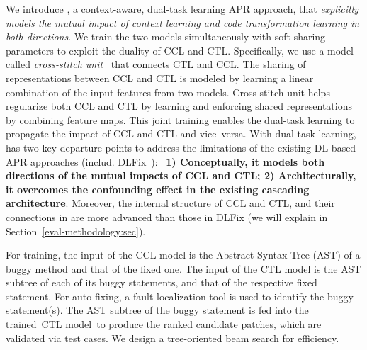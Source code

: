 
We introduce {\tool}, a context-aware, dual-task learning APR
approach, that {\em explicitly models the mutual impact of context
  learning and code transformation learning in both directions}. We
train the two models simultaneously with soft-sharing parameters to
exploit the duality of CCL and CTL. Specifically, we use a model
called {\em cross-stitch unit}~\cite{misra2016cross} that connects CTL
and CCL. The sharing of representations between CCL and CTL is modeled
by learning a linear combination of the input features from two
models. Cross-stitch unit helps regularize both CCL and CTL by
learning and enforcing shared representations by combining feature
maps. This joint training enables the dual-task learning to propagate
the impact of CCL and CTL and vice~versa. With dual-task learning,
{\tool} has two key departure points to address the limitations of the
existing DL-based APR approaches (includ. DLFix~\cite{icse20}):~{\bf
  1) Conceptually, it models both directions of the mutual impacts of
  CCL and CTL; 2) Architecturally, it overcomes the confounding effect
  in the existing cascading architecture}. Moreover, the internal
structure of CCL and CTL, and their connections in {\tool} are more
advanced than those in DLFix (we will explain in
Section~\ref{eval-methodology:sec}).

For training, the input of the CCL model is the Abstract
Syntax Tree (AST) of a buggy method and that of the fixed one.
The input of the CTL model is the AST subtree of each of its buggy
statements, and that of the respective fixed statement. For
auto-fixing, a fault localization tool is used to identify the buggy
statement(s). The AST subtree of the buggy statement is fed into the
trained~CTL model~to produce the ranked candidate patches, which are
validated via test cases. We design a tree-oriented beam search
for efficiency.


